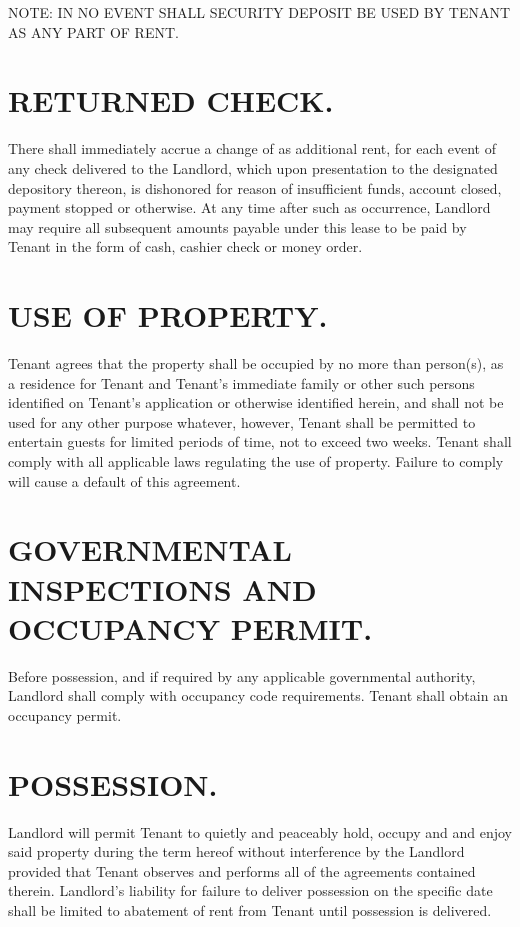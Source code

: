 \documentclass[9pt]{article}
\renewcommand{\MaxTenantsAllowed}{1}
\begin{document}
	\noindent NOTE: IN NO EVENT SHALL SECURITY DEPOSIT BE USED BY TENANT AS ANY PART OF RENT.
	
	\section{RETURNED CHECK.}
	There shall immediately accrue a change of \SmallBox{\$\returnedcheckfee} as additional rent, for each event of any check delivered to the Landlord, which upon presentation to the designated depository thereon, is dishonored for reason of insufficient funds, account closed, payment stopped or otherwise. At any time after such as occurrence, Landlord may require all subsequent amounts payable under this lease to be paid by Tenant in the form of cash, cashier check or money order.
	
	\section{USE OF PROPERTY.}
	Tenant agrees that the property shall be occupied by no more than \TinyBox{\MaxTenantsAllowed} person(s), as a residence for Tenant and Tenant's immediate family or other such persons identified on Tenant's application or otherwise identified herein, and shall not be used for any other purpose whatever, however, Tenant shall be permitted to entertain guests for limited periods of time, not to exceed two weeks. Tenant shall comply with all applicable laws regulating the use of property. Failure to comply will cause a default of this agreement.
	
	\section{GOVERNMENTAL INSPECTIONS AND OCCUPANCY PERMIT.}
	Before possession, and if required by any applicable governmental authority, Landlord shall comply with occupancy code requirements. Tenant shall obtain an occupancy permit.
	
	\section{POSSESSION.}
	Landlord will permit Tenant to quietly and peaceably hold, occupy and and enjoy said property during the term hereof without interference by the Landlord provided that Tenant observes and performs all of the agreements contained therein. Landlord's liability for failure to deliver possession on the specific date shall be limited to abatement of rent from Tenant until possession is delivered.
	
\end{document}
